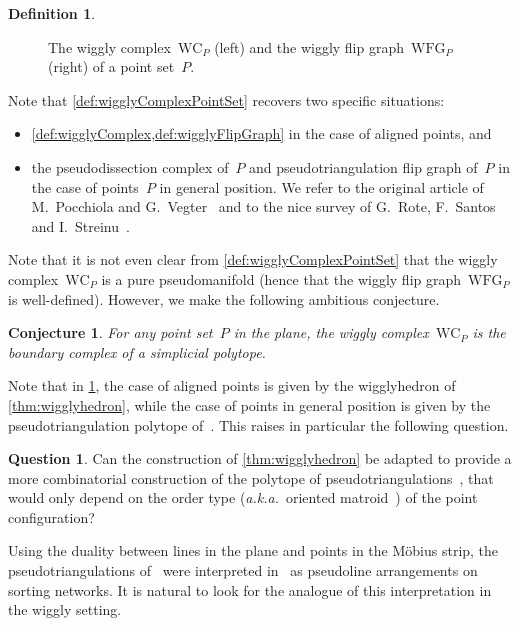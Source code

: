 \documentclass{amsart}
\newtheorem{conjecture}[theorem]{Conjecture}
\theoremstyle{definition}
\newtheorem{definition}[theorem]{Definition}
\newtheorem{question}[theorem]{Question}
\newcommand{\aka}{\textit{a.k.a.}~} %
\newcommand{\wigglyComplex}{\mathrm{WC}} %
\newcommand{\wigglyFlipGraph}{\mathrm{WFG}} %
\begin{document}
\begin{definition}
\begin{figure}[!h]
\caption{The wiggly complex~$\wigglyComplex_P$ (left) and the wiggly flip graph~$\wigglyFlipGraph_P$ (right) of a point set~$P$.}
\label{fig:wigglyComplexSquarre}
\end{figure}
\end{definition}

Note that \cref{def:wigglyComplexPointSet} recovers two specific situations:
\begin{itemize}
\item \cref{def:wigglyComplex,def:wigglyFlipGraph} in the case of aligned points, and
\item the pseudodissection complex of~$P$ and pseudotriangulation flip graph of~$P$ in the case of points~$P$ in general position. We refer to the original article of M.~Pocchiola and G.~Vegter~\cite{PocchiolaVegter} and to the nice survey of G.~Rote, F.~Santos and I.~Streinu~\cite{RoteSantosStreinu-pseudotriangulations}.
\end{itemize}

Note that it is not even clear from \cref{def:wigglyComplexPointSet} that the wiggly complex~$\wigglyComplex_P$ is a pure pseudomanifold (hence that the wiggly flip graph~$\wigglyFlipGraph_P$ is well-defined).
However, we make the following ambitious conjecture.

\begin{conjecture}
\label{conj:polytopality}
For any point set~$P$ in the plane, the wiggly complex~$\wigglyComplex_P$ is the boundary complex of a simplicial polytope.
\end{conjecture}

Note that in \cref{conj:polytopality}, the case of aligned points is given by the wigglyhedron of \cref{thm:wigglyhedron}, while the case of points in general position is given by the pseudotriangulation polytope of~\cite{RoteSantosStreinu-polytope}.
This raises in particular the following question.

\begin{question}
Can the construction of \cref{thm:wigglyhedron} be adapted to provide a more combinatorial construction of the polytope of pseudotriangulations~\cite{RoteSantosStreinu-polytope}, that would only depend on the order type (\aka oriented matroid~\cite{BjornerLasVergnasSturmfelsWhiteZiegler}) of the point configuration?
\end{question}

Using the duality between lines in the plane and points in the M\"obius strip, the pseudotriangulations of~\cite{PocchiolaVegter,RoteSantosStreinu-pseudotriangulations} were interpreted in~\cite{PilaudPocchiola} as pseudoline arrangements on sorting networks.
It is natural to look for the analogue of this interpretation in the wiggly setting.
\end{document}
